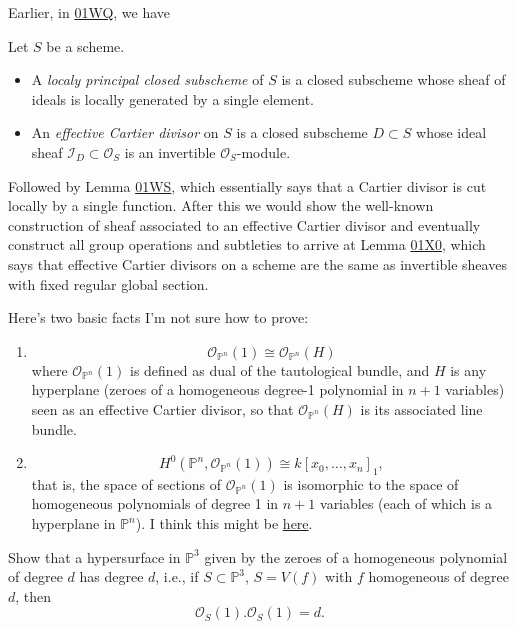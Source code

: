 \medskip\noindent
Earlier, in
\href{https://stacks.math.columbia.edu/tag/%
01WQ}{01WQ},
we have

\begin{definition}
\label{definition-cartier-divisor}
Let $S$ be a scheme.
\begin{itemize}
\item A {\it localy principal closed
subscheme} of $S$
is a closed subscheme whose sheaf of ideals
is locally generated by a single element.

\item An {\it effective Cartier divisor} on
$S$
is a closed subscheme $D \subset S$ whose
ideal sheaf
$\mathcal{I}_D \subset \mathcal{O}_S$ is an
invertible
$\mathcal{O}_S$-module.
\end{itemize}
\end{definition}

\noindent
Followed by Lemma
\href{https://stacks.math.columbia.edu/tag/%
01WS}{01WS},
which essentially says that a Cartier
divisor is cut locally by a single function.
After this we would show the well-known
construction of sheaf associated to an
effective Cartier divisor
and eventually construct all group operations
and subtleties
to arrive at Lemma
\href{https://stacks.math.columbia.edu/tag/%
01X0}{01X0},
which says that effective Cartier divisors on
a scheme
are the same as invertible sheaves with fixed
regular global section.

\medskip\noindent
Here's two basic facts I'm not sure how to
prove:
\begin{enumerate}
\item
$$
\mathcal{O}_{\mathbb{P}^n}(1)\cong
\mathcal{O}_{\mathbb{P}^n}(H)
$$
where $\mathcal{O}_{\mathbb{P}^n}(1)$ is
defined
as dual of the tautological bundle,
and $H$ is any hyperplane (zeroes of a
homogeneous degree-1 polynomial
in $n+1$ variables) seen as an effective
Cartier divisor,
so that $\mathcal{O}_{\mathbb{P}^n}(H)$ is
its associated line bundle.

\item
$$
H^0(\mathbb{P}^n,\mathcal{O}_{\mathbb{P}^n}
(1))
\cong
k[x_0,…,x_n]_1,
$$
that is, the space of sections of
$\mathcal{O}_{\mathbb{P}^n}(1)$
is isomorphic to the space of homogeneous
polynomials
of degree 1 in $n+1$ variables
(each of which is a hyperplane in
$\mathbb{P}^n$).
I think this might be
\href{https://www.youtube.com/live/%
bXhgeRZMu8M?si=5BPdnECUREsCUwpV&t=4601}{
here}.
\end{enumerate}

\begin{exercise}
\label{exercise-degree-d-surface}
Show that a hypersurface in $\mathbb{P}^3$
given by the zeroes of a homogeneous
polynomial
of degree $d$ has degree $d$,
i.e., if $S \subset \mathbb{P}^3$, $S=V(f)$
with
$f$ homogeneous of degree $d$,
then
 $$
\mathcal{O}_S(1).\mathcal{O}_S(1)=d.
$$
\end{exercise}

